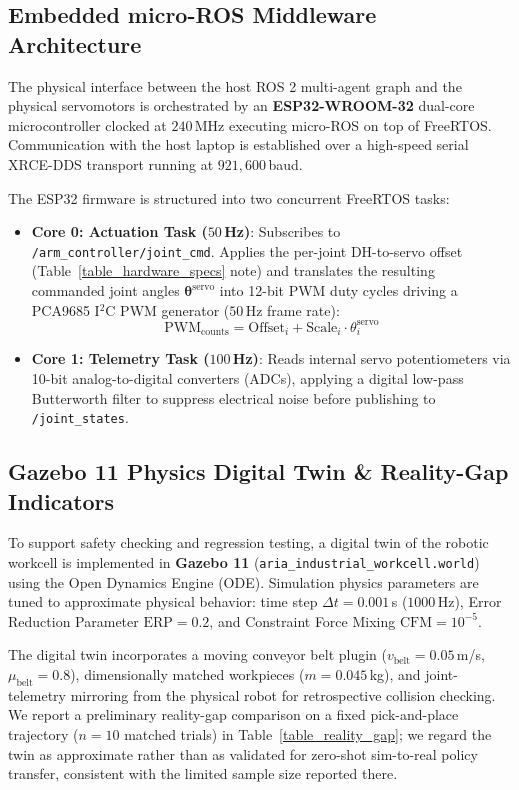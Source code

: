 \documentclass[journal]{IEEEtran}
\begin{document}
\subsection{Embedded micro-ROS Middleware Architecture}
The physical interface between the host ROS 2 multi-agent graph and the physical servomotors is orchestrated by an \textbf{ESP32-WROOM-32} dual-core microcontroller clocked at $240$\,MHz executing micro-ROS on top of FreeRTOS. Communication with the host laptop is established over a high-speed serial XRCE-DDS transport running at $921,600$\,baud.

The ESP32 firmware is structured into two concurrent FreeRTOS tasks:
\begin{itemize}
    \item \textbf{Core 0: Actuation Task ($50$\,Hz)}: Subscribes to \texttt{/arm\_controller/joint\_cmd}. Applies the per-joint DH-to-servo offset (Table~\ref{table_hardware_specs} note) and translates the resulting commanded joint angles $\boldsymbol{\theta}^{\text{servo}}$ into 12-bit PWM duty cycles driving a PCA9685 I$^2$C PWM generator ($50$\,Hz frame rate):
    \begin{equation}
    \text{PWM}_{\text{counts}} = \text{Offset}_i + \text{Scale}_i \cdot \theta_i^{\text{servo}}
    \end{equation}
    \item \textbf{Core 1: Telemetry Task ($100$\,Hz)}: Reads internal servo potentiometers via 10-bit analog-to-digital converters (ADCs), applying a digital low-pass Butterworth filter to suppress electrical noise before publishing to \texttt{/joint\_states}.
\end{itemize}

\subsection{Gazebo 11 Physics Digital Twin \& Reality-Gap Indicators}
To support safety checking and regression testing, a digital twin of the robotic workcell is implemented in \textbf{Gazebo 11} (\texttt{aria\_industrial\_workcell.world}) using the Open Dynamics Engine (ODE). Simulation physics parameters are tuned to approximate physical behavior: time step $\Delta t = 0.001$\,s ($1000$\,Hz), Error Reduction Parameter $\text{ERP} = 0.2$, and Constraint Force Mixing $\text{CFM} = 10^{-5}$.

The digital twin incorporates a moving conveyor belt plugin ($v_{\text{belt}} = 0.05$\,m/s, $\mu_{\text{belt}} = 0.8$), dimensionally matched workpieces ($m = 0.045$\,kg), and joint-telemetry mirroring from the physical robot for retrospective collision checking. We report a preliminary reality-gap comparison on a fixed pick-and-place trajectory ($n=10$ matched trials) in Table~\ref{table_reality_gap}; we regard the twin as approximate rather than as validated for zero-shot sim-to-real policy transfer, consistent with the limited sample size reported there.
\end{document}
